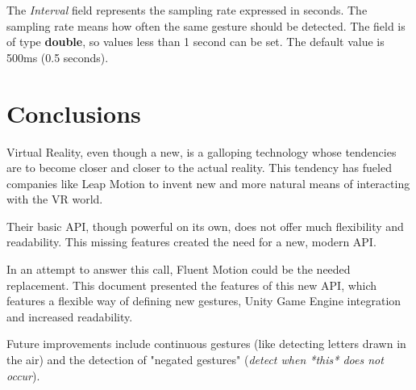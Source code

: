 \documentclass[12pt,a4paper,twoside]{report}
\begin{document}
The \textit{Interval} field represents the sampling rate expressed in seconds. The sampling rate means how often the same gesture should be detected. The field is of type \textbf{double}, so values less than 1 second can be set. The default value is 500ms (0.5 seconds).

\chapter{Conclusions}

Virtual Reality, even though a new, is a galloping technology whose tendencies are to become closer and closer to the actual reality. This tendency has fueled companies like Leap Motion to invent new and more natural means of interacting with the VR world.

Their basic API, though powerful on its own, does not offer much flexibility and readability. This missing features created the need for a new, modern API.

In an attempt to answer this call, Fluent Motion could be the needed replacement. This document presented the features of this new API, which features a flexible way of defining new gestures, Unity Game Engine integration and increased readability.

Future improvements include continuous gestures (like detecting letters drawn in the air) and the detection of "negated gestures" (\textit{detect when *this* does not occur}).

 


\end{document}
